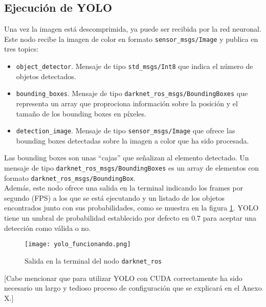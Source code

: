 \subsection{Ejecución de YOLO}

Una vez la imagen está descomprimida, ya puede ser recibida por la red neuronal. Este nodo recibe la imagen de color en formato \texttt{sensor\_msgs/Image} y publica en tres topics:

\begin{itemize}

	\item \texttt{object\_detector}. Mensaje de tipo \texttt{std\_msgs/Int8} que indica el número de objetos detectados.
	\item \texttt{bounding\_boxes}. Mensaje de tipo \texttt{darknet\_ros\_msgs/BoundingBoxes} que representa un array que proprociona información sobre la posición y el tamaño de los bounding boxes en píxeles.
	\item \texttt{detection\_image}. Mensaje de tipo \texttt{sensor\_msgs/Image} que ofrece las bounding boxes detectadas sobre la imagen a color que ha sido procesada.
	
\end{itemize}

Las bounding boxes son unas ``cajas'' que señalizan al elemento detectado. Un mensaje de tipo \texttt{darknet\_ros\_msgs/BoundingBoxes} es un array de elementos con formato \texttt{darknet\_ros\_msgs/BoundingBox}.\\

Además, este nodo ofrece una salida en la terminal indicando los frames por segundo (FPS) a los que se está ejecutando y un listado de los objetos encontrados junto con sus probabilidades, como se muestra en la figura \ref{fig:yolo_funcionando}. YOLO tiene un umbral de probabilidad establecido por defecto en $0.7$ para aceptar una detección como válida o no. \\

\begin{figure}[h]
	\begin{center} 
		\texttt{[image: yolo\_funcionando.png]}
	\end{center}
	\caption{Salida en la terminal del nodo \texttt{darknet\_ros}}
	\label{fig:yolo_funcionando}
\end{figure}

[Cabe mencionar que para utilizar YOLO con CUDA correctamente ha sido necesario un largo y tedioso proceso de configuración que se explicará en el Anexo X.]\\

